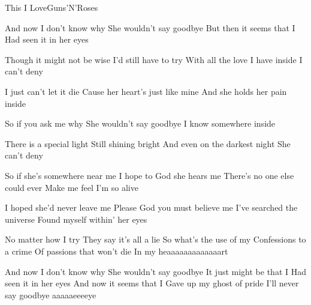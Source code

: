 \begin{Song}{This I Love}{Guns'N'Roses}
\begin{multicols}{2}

\begin{Verse}
And now I don't know why
She wouldn't say goodbye
But then it seems that I
Had seen it in her eyes
\espaceInterStrophe

Though it might not be wise
I'd still have to try
With all the love I have inside
I can't deny
\espaceInterStrophe

I just can't let it die
Cause her heart's just like mine
And she holds her pain inside
\espaceInterStrophe

So if you ask me why
She wouldn't say goodbye
I know somewhere inside
\espaceInterStrophe

There is a special light
Still shining bright
And even on the darkest night
She can't deny
\end{Verse}
\espaceInterStrophe

\begin{Chorus}
So if she's somewhere near me
I hope to God she hears me
There's no one else could ever
Make me feel I'm so alive
\espaceInterStrophe

I hoped she'd never leave me
Please God you must believe me
I've searched the universe
Found myself within' her eyes
\end{Chorus}
\espaceInterStrophe

\begin{Verse}
No matter how I try
They say it's all a lie
So what's the use of my
Confessions to a crime
Of passions that won't die
In my heaaaaaaaaaaaaart
\end{Verse}
\espaceInterStrophe

\tochorus
\espaceInterStrophe

\espaceInterStrophe

\tochorus
\espaceInterStrophe

\begin{Verse}
And now I don't know why
She wouldn't say goodbye
It just might be that I
Had seen it in her eyes
And now it seems that I
Gave up my ghost of pride
I'll never say goodbye aaaaaeeeeye
\end{Verse}

\end{multicols}

\vfill

\begin{multicols}{2}


\end{multicols}
\end{Song}

